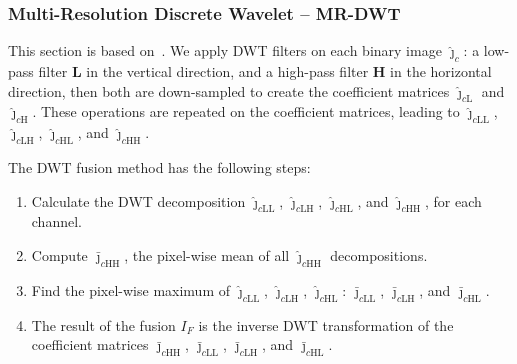 \documentclass[journal]{IEEEtran}
\begin{document}
\subsubsection{Multi-Resolution Discrete Wavelet -- MR-DWT} 
This section is based on~\cite{n_r}.
We apply DWT filters on each binary image $\bm{\widehat\jmath}_c$: a low-pass filter $\bm L$ in the vertical direction, and a high-pass filter $\bm H$ in the horizontal direction, then both are down-sampled to create the coefficient matrices $\bm{\widehat\jmath}_{c\text{L}}$ and $\bm{\widehat\jmath}_{c\text{H}}$.
These operations are repeated on the coefficient matrices, leading to $\bm{\widehat\jmath}_{c\text{LL}}$, $\bm{\widehat\jmath}_{c\text{LH}}$, $\bm{\widehat\jmath}_{c\text{HL}}$, and $\bm{\widehat\jmath}_{c\text{HH}}$.

The DWT fusion method has the following steps:
\begin{enumerate}
\item Calculate the DWT decomposition $\bm{\widehat\jmath}_{c\text{LL}}$, $\bm{\widehat\jmath}_{c\text{LH}}$, $\bm{\widehat\jmath}_{c\text{HL}}$, and $\bm{\widehat\jmath}_{c\text{HH}}$, for each channel.
\item Compute $\bm{\bar\jmath}_{c\text{HH}}$, the pixel-wise mean of all $\bm{\widehat\jmath}_{c\text{HH}}$ decompositions.
\item Find the pixel-wise maximum of $\bm{\widehat\jmath}_{c\text{LL}}$, $\bm{\widehat\jmath}_{c\text{LH}}$, $\bm{\widehat\jmath}_{c\text{HL}}$: $\bm{\bar\jmath}_{c\text{LL}}$, $\bm{\bar\jmath}_{c\text{LH}}$, and $\bm{\bar\jmath}_{c\text{HL}}$.
\item The result of the fusion $I_F$ is the inverse DWT transformation of the coefficient matrices $\bm{\bar\jmath}_{c\text{HH}}$, $\bm{\bar\jmath}_{c\text{LL}}$, $\bm{\bar\jmath}_{c\text{LH}}$, and $\bm{\bar\jmath}_{c\text{HL}}$.
\end{enumerate}
\end{document}
